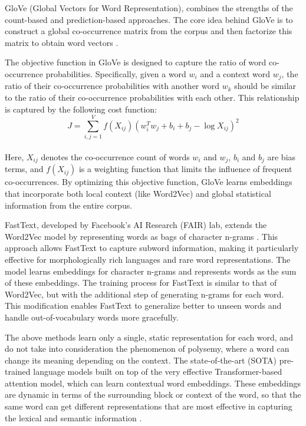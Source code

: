 GloVe (Global Vectors for Word Representation), combines the strengths of the count-based and prediction-based approaches. The core idea behind GloVe is to construct a global co-occurrence matrix from the corpus and then factorize this matrix to obtain word vectors \cite{Pennington.2014}.

The objective function in GloVe is designed to capture the ratio of word co-occurrence probabilities. Specifically, given a word \(w_i\) and a context word \(w_j\), the ratio of their co-occurrence probabilities with another word \(w_k\) should be similar to the ratio of their co-occurrence probabilities with each other. This relationship is captured by the following cost function: \\
\[
J = \sum_{i,j=1}^{V} f(X_{ij})(w_i^T w_j + b_i + b_j - \log X_{ij})^2
\]\\
Here, \(X_{ij}\) denotes the co-occurrence count of words \(w_i\) and \(w_j\), \(b_i\) and \(b_j\) are bias terms, and \(f(X_{ij})\) is a weighting function that limits the influence of frequent co-occurrences. By optimizing this objective function, GloVe learns embeddings that incorporate both local context (like Word2Vec) and global statistical information from the entire corpus.

FastText, developed by Facebook's AI Research (FAIR) lab, extends the Word2Vec model by representing words as bags of character n-grams \cite{Joulin.6Jul2016}. This approach allows FastText to capture subword information, making it particularly effective for morphologically rich languages and rare word representations. The model learns embeddings for character n-grams and represents words as the sum of these embeddings. The training process for FastText is similar to that of Word2Vec, but with the additional step of generating n-grams for each word. This modification enables FastText to generalize better to unseen words and handle out-of-vocabulary words more gracefully.

The above methods learn only a single, static representation for each word, and do not take into consideration the phenomenon of polysemy, where a word can change its meaning depending on the context. The state-of-the-art (SOTA) pre-trained language models built on top of the very effective Transformer-based attention model, which can learn contextual word embeddings. These embeddings are dynamic in terms of the surrounding block or context of the word, so that the same word can get different representations that are most effective in capturing the lexical and semantic information \cite{Xia.14Jun2022}. 

